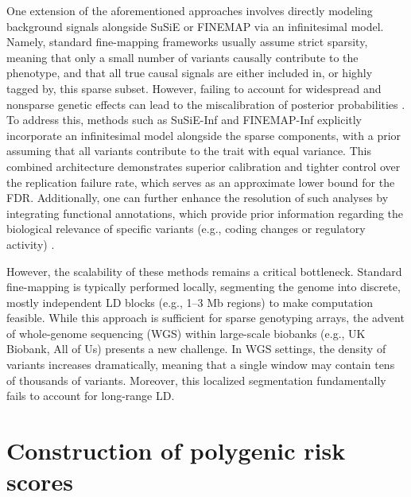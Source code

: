 One extension of the aforementioned approaches involves directly modeling background signals alongside SuSiE or FINEMAP via an infinitesimal model. Namely, standard fine-mapping frameworks usually assume strict sparsity, meaning that only a small number of variants causally contribute to the phenotype, and that all true causal signals are either included in, or highly tagged by, this sparse subset. However, failing to account for widespread and nonsparse genetic effects can lead to the miscalibration of posterior probabilities \cite{infinitesimalFineMapping2024}. To address this, methods such as SuSiE-Inf and FINEMAP-Inf \cite{infinitesimalFineMapping2024} explicitly incorporate an infinitesimal model alongside the sparse components, with a prior assuming that all variants contribute to the trait with equal variance. This combined architecture demonstrates superior calibration and tighter control over the replication failure rate, which serves as an approximate lower bound for the FDR. Additionally, one can further enhance the resolution of such analyses by integrating functional annotations, which provide prior information regarding the biological relevance of specific variants (e.g., coding changes or regulatory activity) \cite{FineMappingReview2025}. 

However, the scalability of these methods remains a critical bottleneck. Standard fine-mapping is typically performed locally, segmenting the genome into discrete, mostly independent LD blocks (e.g., 1--3 Mb regions) to make computation feasible. While this approach is sufficient for sparse genotyping arrays, the advent of whole-genome sequencing (WGS) within large-scale biobanks (e.g., UK Biobank, All of Us) presents a new challenge. In WGS settings, the density of variants increases dramatically, meaning that a single window may contain tens of thousands of variants. Moreover, this localized segmentation fundamentally fails to account for long-range LD. 

\section{Construction of polygenic risk scores}

